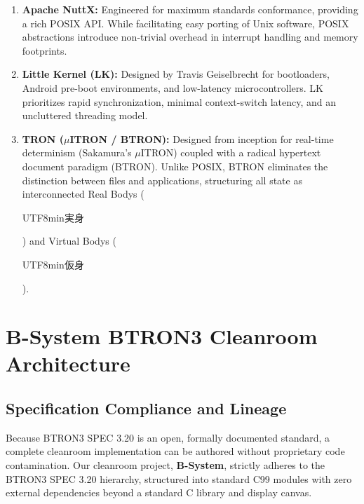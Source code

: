 \documentclass[10pt,journal,compsoc,twocolumn]{article}
\newcommand{\ja}[1]{\begin{CJK*}{UTF8}{min}#1\end{CJK*}}
\begin{document}
\begin{enumerate}[leftmargin=*]
    \item \textbf{Apache NuttX:} Engineered for maximum standards conformance, providing a rich POSIX API. While facilitating easy porting of Unix software, POSIX abstractions introduce non-trivial overhead in interrupt handling and memory footprints.
    \item \textbf{Little Kernel (LK):} Designed by Travis Geiselbrecht for bootloaders, Android pre-boot environments, and low-latency microcontrollers. LK prioritizes rapid synchronization, minimal context-switch latency, and an uncluttered threading model.
    \item \textbf{TRON ($\mu$ITRON / BTRON):} Designed from inception for real-time determinism (Sakamura's $\mu$ITRON) coupled with a radical hypertext document paradigm (BTRON). Unlike POSIX, BTRON eliminates the distinction between files and applications, structuring all state as interconnected Real Bodys (\ja{実身}) and Virtual Bodys (\ja{仮身}).
\end{enumerate}

\section{B-System BTRON3 Cleanroom Architecture}
\label{sec:cleanroom}

\subsection{Specification Compliance and Lineage}
Because BTRON3 SPEC 3.20 is an open, formally documented standard, a complete cleanroom implementation can be authored without proprietary code contamination. Our cleanroom project, \textbf{B-System}, strictly adheres to the BTRON3 SPEC 3.20 hierarchy, structured into standard C99 modules with zero external dependencies beyond a standard C library and display canvas.
\end{document}
